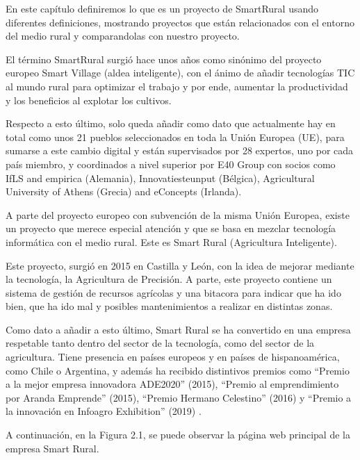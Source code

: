 En este capítulo definiremos lo que es un proyecto de SmartRural usando diferentes definiciones, mostrando proyectos que están relacionados con el entorno del medio rural y comparandolas con nuestro proyecto.

\newpage

El término SmartRural surgió hace unos años como sinónimo del proyecto europeo Smart Village \cite{smart-village} (aldea inteligente), con el ánimo de añadir tecnologías TIC al mundo rural para optimizar el trabajo y por ende, aumentar la productividad y los beneficios al explotar los cultivos.

Respecto a esto último, solo queda añadir como dato que actualmente hay en total como unos 21 pueblos seleccionados en toda la Unión Europea (UE), para sumarse a este cambio digital y están supervisados por 28 expertos, uno por cada país miembro, y coordinados a nivel superior por E40 Group \cite{e40group} con socios como IfLS and empirica \cite{ifls} (Alemania), Innovatiesteunput \cite{innovatiesteunput} (Bélgica), Agricultural University of Athens \cite{greece} (Grecia) and eConcepts \cite{econcepts} (Irlanda).

A parte del proyecto europeo con subvención de la misma Unión Europea, existe un proyecto que merece especial atención y que se basa en mezclar tecnología informática con el medio rural. Este es Smart Rural \cite{smart-rural} (Agricultura Inteligente). 

Este proyecto, surgió en 2015 en Castilla y León, con la idea de mejorar mediante la tecnología, la Agricultura de Precisión. A parte, este proyecto contiene un sistema de gestión de recursos agrícolas y una bitacora para indicar que ha ido bien, que ha ido mal y posibles mantenimientos a realizar en distintas zonas.

Como dato a añadir a esto último, Smart Rural se ha convertido en una empresa respetable tanto dentro del sector de la tecnología, como del sector de la agricultura. Tiene presencia en países europeos y en países de hispanoamérica, como Chile o Argentina, y además ha recibido distintivos premios como ``Premio a la mejor empresa innovadora ADE2020'' (2015), ``Premio al emprendimiento por Aranda Emprende'' (2015), ``Premio Hermano Celestino'' (2016) y ``Premio a la innovación en Infoagro Exhibition'' (2019) \cite{team-smartrural}.

A continuación, en la Figura 2.1, se puede observar la página web principal de la empresa Smart Rural.

